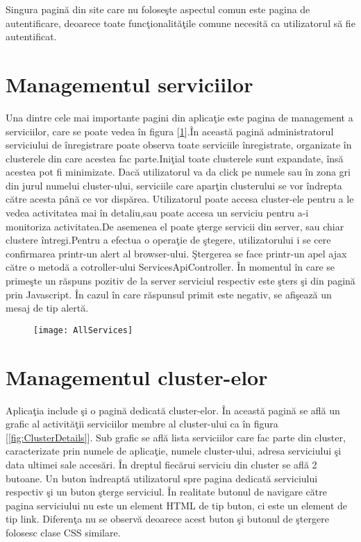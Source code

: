 \documentclass[a4paper,12pt]{report}
\let\oldref\ref
\renewcommand{\ref}[1]{[\oldref{#1}]}
\begin{document}
Singura pagin\u a din site care nu folose\c ste aspectul comun este pagina de autentificare, deoarece toate 
func\c tionalit\u a\c tile comune necesit\u a ca utilizatorul s\u a fie autentificat.

\section{Managementul serviciilor}

Una dintre cele mai importante pagini din aplica\c tie este pagina de management a
serviciilor, care se poate vedea \^in figura \ref{fig:AllServices}.\^In aceast\u a pagin\u a
administratorul serviciului de \^inregistrare poate observa toate serviciile \^inregistrate,
organizate \^in clusterele din care acestea fac parte.Ini\c tial toate clusterele sunt expandate, \^ins\u a
acestea pot fi minimizate. Dac\u a utilizatorul va da click pe numele sau \^in zona gri din jurul numelui cluster-ului,
serviciile care apar\c tin clusterului se vor \^indrepta c\u atre acesta p\^an\u a ce vor disp\u area.
Utilizatorul poate accesa cluster-ele 
pentru a le vedea activitatea mai \^in detaliu,sau poate accesa un serviciu pentru 
a-i monitoriza activitatea.De asemenea el poate \c sterge servicii din server, sau chiar
clustere \^intregi.Pentru a efectua o opera\c tie de \c stegere, utilizatorului i se cere 
confirmarea printr-un alert al browser-ului. \c Stergerea se face printr-un apel ajax c\u atre o metod\u a 
a cotroller-ului ServicesApiController. 
\^In momentul \^in care se prime\c ste un r\u aspuns pozitiv de la server serviciul respectiv este \c sters \c si din pagin\u a
prin Javascript. \^In cazul \^in care r\u aspunsul primit este negativ, se afi\c seaz\u a un mesaj de tip alert\u a.


\begin{figure}[!htb]
	\texttt{[image: AllServices]}
	\label{fig:AllServices}
\end{figure}

\section{Managementul cluster-elor}

Aplica\c tia include \c si o pagin\u a dedicat\u a cluster-elor. \^In aceast\u a pagin\u a se afl\u a 
un grafic al activit\u a\c tii serviciilor membre al cluster-ului ca \^in figura \ref{fig:ClusterDetails}. Sub grafic se  
afl\u a lista serviciilor care fac parte din cluster, caracterizate prin numele de aplica\c tie, 
numele cluster-ului, adresa serviciului \c si data ultimei sale acces\u ari.
\^In dreptul fiec\u arui serviciu din cluster se afl\u a 2 butoane. Un buton \^indreapt\u a utilizatorul spre pagina 
dedicat\u a serviciului respectiv \c si un buton \c sterge serviciul. \^In realitate butonul de navigare c\u atre pagina 
serviciului nu este un element HTML de tip buton, ci este un element de tip link. Diferen\c ta nu se observ\u a deoarece
acest buton \c si butonul de \c stergere folosesc clase CSS similare.
\end{document}
